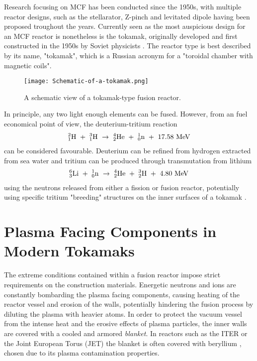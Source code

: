 Research focusing on MCF has been conducted since the 1950s, with multiple reactor designs, such as the stellarator, Z-pinch and levitated dipole having been proposed troughout the years. 
Currently seen as the most auspicious design for an MCF reactor is nonetheless is the tokamak, originally developed and first constructed in the 1950s by Soviet physicists \cite{tokamakorigins}. 
The reactor type is best described by its name, "tokamak", which is a Russian acronym for a "toroidal chamber with magnetic coils".

\begin{figure}[!ht]
\center
\texttt{[image: Schematic-of-a-tokamak.png]}
\caption{A schematic view of a tokamak-type fusion reactor.} 
\label{fig:tokamak}
\end{figure}

In principle, any two light enough elements can be fused. 
However, from an fuel economical point of view, the deuterium-tritium reaction 
\begin{align}
^2_1\rm{H} ~+~ ^3_1\rm{H} ~\rightarrow~ ^4_2\rm{He} ~+~ ^1_0\rm{n} ~+~ 17.58 ~\rm{MeV}
\label{Eq:D-T-reaction}
\end{align}
can be considered favourable. 
Deuterium can be refined from hydrogen extracted from sea water and tritium can be produced through transmutation from lithium
\begin{align}
^6_3\rm{Li} ~+~ ^1_0\rm{n} ~\rightarrow~ ^4_2\rm{He} ~+~ ^3_2\rm{H} ~+~ 4.80  ~\rm{MeV}
\end{align}
using the neutrons released from either a fission or fusion reactor, potentially using specific tritium "breeding" structures on the inner surfaces of a tokamak \cite{giancarli2012overview}.


\section{Plasma Facing Components in Modern Tokamaks}

The extreme conditions contained within a fusion reactor impose strict requirements on the construction materials. 
Energetic neutrons and ions are constantly bombarding the plasma facing components, causing heating of the reactor vessel and erosion of the walls, potentially hindering the fusion process by diluting the plasma with heavier atoms. 
In order to protect the vacuum vessel from the intense heat and the erosive effects of plasma particles, the inner walls are covered with a cooled and armored \textit{blanket}. 
In reactors such as the ITER or the Joint European Torus (JET) the blanket is often covered with beryllium \cite{raffray2012overview}, chosen due to its plasma contamination properties.

